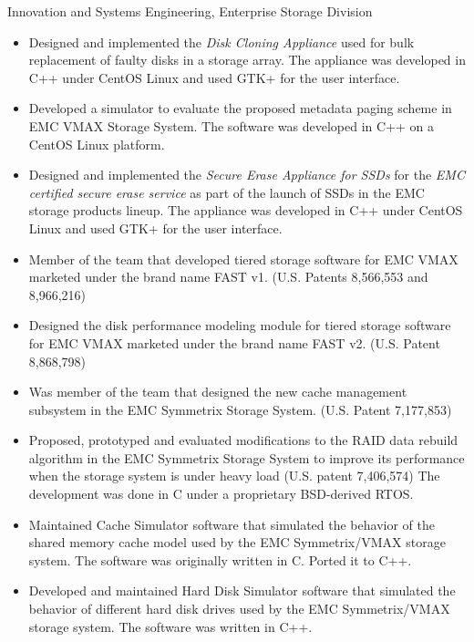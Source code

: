 {Innovation and Systems Engineering, Enterprise Storage Division}
{
	\begin{itemize}
        \item Designed and implemented the {\em Disk Cloning Appliance} used for bulk
            replacement of faulty disks in a storage array. The appliance was
			developed in C++ under CentOS Linux and used GTK+ for the user
			interface.
		\item Developed a simulator to evaluate the proposed metadata paging
			scheme in EMC VMAX Storage System. The software was developed in
			C++ on a CentOS Linux platform.
	\end{itemize}
}
{ 
	\begin{itemize}
		\item Designed and implemented the {\em Secure Erase Appliance for SSDs}
			for the {\em EMC certified secure erase service} as part of the
			launch of SSDs in the EMC storage products lineup. The appliance was
			developed in C++ under CentOS Linux and used GTK+ for the user
			interface.
		\item Member of the team that developed tiered storage software for
			EMC VMAX marketed under the brand name FAST v1. (U.S. Patents
			8,566,553 and 8,966,216)
		\item Designed the disk performance modeling module for tiered storage
			software for EMC VMAX marketed under the brand name FAST v2.
			(U.S. Patent 8,868,798)
	\end{itemize}
}
{
	\begin{itemize}
		\item Was member of the team that designed the new cache management
			subsystem in the EMC Symmetrix Storage System. (U.S. Patent 7,177,853)
		\item Proposed, prototyped and evaluated modifications to the RAID data rebuild algorithm
			in the EMC Symmetrix Storage System to improve its performance when
			the storage system is under heavy load (U.S. patent 7,406,574) The
			development was done in C under a proprietary BSD-derived RTOS.
		\item Maintained Cache Simulator software that simulated the behavior of the 
			shared memory cache model used by the EMC Symmetrix/VMAX storage system.
			The software was originally written in C. Ported it to C++.
		\item Developed and maintained Hard Disk Simulator software that
			simulated the behavior of different hard disk drives used by the
			EMC Symmetrix/VMAX storage system. The software was written in C++.
	\end{itemize}
}
